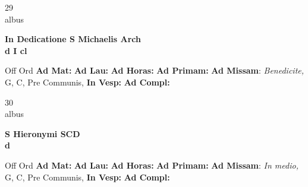 \documentclass[10pt, openany]{book}
\begin{document}
    \begin{center}
        \begin{minipage}{3.5in}
            \vspace{2em}
            \begin{minipage}{0.5in}
                {\Huge 29} \\
                {\normalsize albus}
            \end{minipage}
            \begin{minipage}{3.0in}
                \textbf{ \large In Dedicatione S Michaelis Arch \\
                \textnormal{\normalsize d I cl}}

            \end{minipage}
            \begin{justify}Off Ord
                \textbf{Ad Mat: }
                \textbf{Ad Lau: }
                \textbf{Ad Horas: }
                \textbf{Ad Primam: }\textbf{Ad Missam}: \textit{Benedicite,} G, C, Pre Communis, 
                \textbf{In Vesp: }
                \textbf{Ad Compl: }
            \end{justify}
        \end{minipage}
    \end{center}

    \begin{center}
        \begin{minipage}{3.5in}
            \vspace{2em}
            \begin{minipage}{0.5in}
                {\Huge 30} \\
                {\normalsize albus}
            \end{minipage}
            \begin{minipage}{3.0in}
                \textbf{ \large S Hieronymi SCD \\
                \textnormal{\normalsize d}}

            \end{minipage}
            \begin{justify}Off Ord
                \textbf{Ad Mat: }
                \textbf{Ad Lau: }
                \textbf{Ad Horas: }
                \textbf{Ad Primam: }\textbf{Ad Missam}: \textit{In medio,} G, C, Pre Communis, 
                \textbf{In Vesp: }
                \textbf{Ad Compl: }
            \end{justify}
        \end{minipage}
    \end{center}
\end{document}

